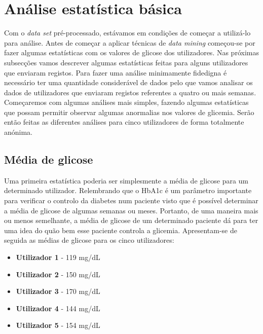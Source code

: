 \section{Análise estatística básica}

Com o \textit{data set} pré-processado, estávamos em condições de começar a utilizá-lo para análise. Antes de começar a aplicar técnicas de \textit{data mining} começou-se por fazer algumas estatísticas com os valores de glicose dos utilizadores. Nas próximas subsecções vamos descrever algumas estatísticas feitas para alguns utilizadores que enviaram registos. Para fazer uma análise minimamente fidedigna é necessário ter uma quantidade considerável de dados pelo que vamos analisar os dados de utilizadores que enviaram registos referentes a quatro ou mais semanas. Começaremos com algumas análises mais simples, fazendo algumas estatísticas que possam permitir observar algumas anormalias nos valores de glicemia. Serão então feitas as diferentes análises para cinco utilizadores de forma totalmente anónima.


\subsection{Média de glicose}

Uma primeira estatística poderia ser simplesmente a média de glicose para um determinado utilizador. Relembrando que o HbA1c é um parâmetro importante para verificar o controlo da diabetes num paciente visto que é possível determinar a média de glicose de algumas semanas ou meses. Portanto, de uma maneira mais ou menos semelhante, a média de glicose de um determinado paciente dá para ter uma idea do quão bem esse paciente controla a glicemia. Apresentam-se de seguida as médias de glicose para os cinco utilizadores:

\begin{itemize}
\item \textbf{Utilizador 1} - 119 mg/dL
\item \textbf{Utilizador 2} - 150 mg/dL
\item \textbf{Utilizador 3} - 170 mg/dL
\item \textbf{Utilizador 4} - 144 mg/dL
\item \textbf{Utilizador 5} - 154 mg/dL

\end{itemize}

